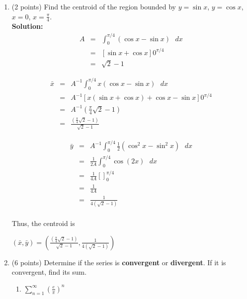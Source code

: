 \documentclass[paper=a4, fontsize=11pt]{scrartcl} %
\numberwithin{equation}{section} %
\numberwithin{figure}{section} %
\numberwithin{table}{section} %
\begin{document}
\begin{enumerate}
\item (2 points) Find the centroid of the region bounded by $y= \sin x$, $y= \cos x$, $x = 0$, $x = \frac{\pi}{4}$. \\

\noindent\textbf{Solution:}\\
\begin{eqnarray*}
A &=& \int_0^{\pi/4} \left( \cos x - \sin x \right) \text{ } dx \\
&=& \left[ \sin x + \cos x \right]0^{\pi/4} \\
&=& \sqrt{2}-1
\end{eqnarray*}

\begin{eqnarray*}
\bar{x} &=& A^{-1}\int_0^{\pi/4} x \left( \cos x - \sin x \right) \text{ } dx \\
&=& A^{-1} \left[ x \left( \sin x + \cos x \right) + \cos x - \sin x \right]0^{\pi/4} \\
&=& A^{-1} \left( \frac{\pi}{4} \sqrt{2} -1\right) \\
&=& \frac{ \left( \frac{\pi}{4} \sqrt{2} -1\right)}{\sqrt{2}-1}
\end{eqnarray*}

\begin{eqnarray*}
\bar{y} &=& A^{-1} \int_0^{\pi/4} \frac{1}{2} \left( \cos ^2 x - \sin ^2 x \right) \text{ } dx \\
&=& \frac{1}{2A} \int_0^{\pi/4} \cos(2x) \text{ } dx  \\
&=& \frac{1}{4A} \left[ \right]_0^{\pi/4} \\
&=& \frac{1}{4A}\\
&=& \frac{1}{4(\sqrt{2}-1)} \\
\end{eqnarray*}

Thus, the centroid is \begin{large}$\boxed{(\bar{x},\bar{y})=\left(\frac{ \left( \frac{\pi}{4} \sqrt{2} -1\right)}{\sqrt{2}-1} ,\frac{1}{4(\sqrt{2}-1)}\right)}$\end{large}
\newpage


\item (6 points) Determine if the series is \textbf{convergent} or \textbf{divergent}.  If it is convergent, find its sum.
\begin{enumerate}
\item \begin{large}$\sum\limits_{n=1}^\infty \left( \frac{e}{\pi} \right)^n$\end{large}


\end{enumerate}
\end{enumerate}
\end{document}

